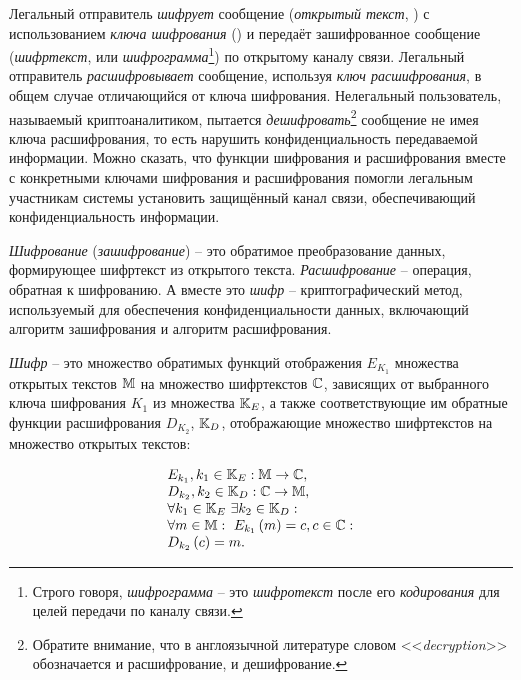 Легальный отправитель \emph{шифрует} сообщение (\emph{открытый текст}, ) с использованием \emph{ключа шифрования} () и передаёт зашифрованное сообщение (\emph{шифртекст},  или \emph{шифрограмма}\footnote{Строго говоря, \emph{шифрограмма} -- это \emph{шифротекст} после его \emph{кодирования} для целей передачи по каналу связи.}) по открытому каналу связи. Легальный отправитель \emph{расшифровывает} сообщение, используя \emph{ключ расшифрования}, в общем случае отличающийся от ключа шифрования. Нелегальный пользователь, называемый криптоаналитиком, пытается \emph{дешифровать}\footnote{Обратите внимание, что в англоязычной литературе словом <<\textit{decryption}>> обозначается и расшифрование, и дешифрование.} сообщение не имея ключа расшифрования, то есть нарушить конфиденциальность передаваемой информации. Можно сказать, что функции шифрования и расшифрования вместе с конкретными ключами шифрования и расшифрования помогли легальным участникам системы установить защищённый канал связи, обеспечивающий конфиденциальность информации.

\emph{Шифрование} (\emph{зашифрование}) -- это обратимое преобразование данных, формирующее шифртекст из открытого текста. \emph{Расшифрование} -- операция, обратная к шифрованию. А вместе это \emph{шифр} -- криптографический метод, используемый для обеспечения конфиденциальности данных, включающий алгоритм зашифрования и алгоритм расшифрования.~\cite{GOST-89}

\emph{Шифр} -- это множество обратимых функций отображения $E_{K_1}$ множества открытых текстов $\mathbb{M}$ на множество шифртекстов $\mathbb{C}$, зависящих от выбранного ключа шифрования $K_1$ из множества $\mathbb{K}_E$, а также соответствующие им обратные функции расшифрования $D_{K_2}$, $\mathbb{K}_D$, отображающие множество шифртекстов на множество открытых текстов:

\begin{equation}\label{eq:Encryption}\begin{array}{l}
	E_{k_1}, k_1 \in \mathbb{K}_E: \mathbb{M} \to \mathbb{C}, \\
	D_{k_2}, k_2 \in \mathbb{K}_D: \mathbb{C} \to \mathbb{M}, \\
	\forall k_1 \in \mathbb{K}_E ~ \exists k_2 \in \mathbb{K}_D: \\
	\forall m \in \mathbb{M}: ~ E_{k_1} \left( m \right) = c, c \in \mathbb{C}: \\
	D_{k_2} \left( c \right) = m.
\end{array}\end{equation}

